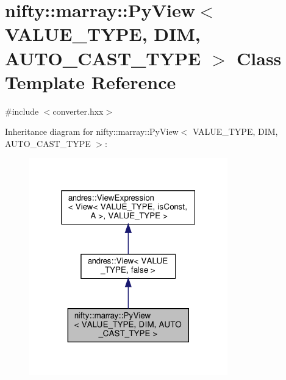 \hypertarget{classnifty_1_1marray_1_1PyView}{}\section{nifty\+:\+:marray\+:\+:Py\+View$<$ V\+A\+L\+U\+E\+\_\+\+T\+Y\+PE, D\+IM, A\+U\+T\+O\+\_\+\+C\+A\+S\+T\+\_\+\+T\+Y\+PE $>$ Class Template Reference}
\label{classnifty_1_1marray_1_1PyView}


{\ttfamily \#include $<$converter.\+hxx$>$}



Inheritance diagram for nifty\+:\+:marray\+:\+:Py\+View$<$ V\+A\+L\+U\+E\+\_\+\+T\+Y\+PE, D\+IM, A\+U\+T\+O\+\_\+\+C\+A\+S\+T\+\_\+\+T\+Y\+PE $>$\+:
\nopagebreak
\begin{figure}[H]
\begin{center}
\leavevmode
\includegraphics[width=244pt]{classnifty_1_1marray_1_1PyView__inherit__graph}
\end{center}
\end{figure}


